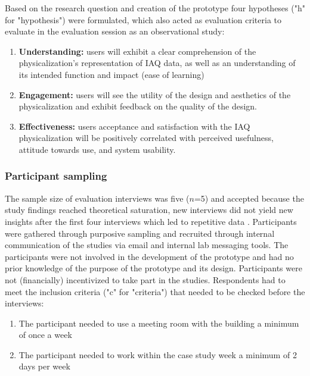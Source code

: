 Based on the research question and creation of the prototype four hypotheses ("h" for "hypothesis") were formulated, which also acted as evaluation criteria to evaluate in the evaluation session as an observational study:

\begin{enumerate}
    \renewcommand{\labelenumi}{H\arabic{enumi}:}
    \item \textbf{Understanding:} users will exhibit a clear comprehension of the physicalization's representation of IAQ data, as well as an understanding of its intended function and impact (ease of learning)
    \item \textbf{Engagement:} users will see the utility of the design and aesthetics of the physicalization and exhibit feedback on the quality of the design.
    \item \textbf{Effectiveness:} users acceptance and satisfaction with the IAQ physicalization will be positively correlated with perceived usefulness, attitude towards use, and system usability.
\end{enumerate}

\subsubsection{Participant sampling}

The sample size of evaluation interviews was five ($n$=5) and accepted because the study findings reached theoretical saturation, new interviews did not yield new insights after the first four interviews which led to repetitive data \cite{steph_menken_introduction_2016}. Participants were gathered through purposive sampling and recruited through internal communication of the studies via email and internal lab messaging tools. The participants were not involved in the development of the prototype and had no prior knowledge of the purpose of the prototype and its design. Participants were not (financially) incentivized to take part in the studies. Respondents had to meet the inclusion criteria ("c" for "criteria") that needed to be checked before the interviews: 

\begin{enumerate}
    \renewcommand{\labelenumi}{C\arabic{enumi}:}
    \item The participant needed to use a meeting room with the building a minimum of once a week
    \item The participant needed to work within the case study week a minimum of 2 days per week
\end{enumerate}

